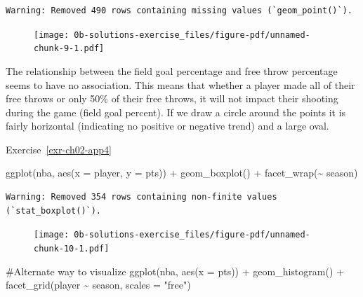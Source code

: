 \documentclass[
  letterpaper,
  DIV=11,
  numbers=noendperiod]{scrreprt}
\newenvironment{Shaded}{\begin{snugshade}}{\end{snugshade}}
\newcommand{\AttributeTok}[1]{\textcolor[rgb]{0.40,0.45,0.13}{#1}}
\newcommand{\CommentTok}[1]{\textcolor[rgb]{0.37,0.37,0.37}{#1}}
\newcommand{\FunctionTok}[1]{\textcolor[rgb]{0.28,0.35,0.67}{#1}}
\newcommand{\NormalTok}[1]{\textcolor[rgb]{0.00,0.23,0.31}{#1}}
\newcommand{\SpecialCharTok}[1]{\textcolor[rgb]{0.37,0.37,0.37}{#1}}
\newcommand{\StringTok}[1]{\textcolor[rgb]{0.13,0.47,0.30}{#1}}
\theoremstyle{definition}
\theoremstyle{remark}
\begin{document}
\begin{verbatim}
Warning: Removed 490 rows containing missing values (`geom_point()`).
\end{verbatim}

\begin{figure}[H]

{\centering \texttt{[image: 0b-solutions-exercise\_files/figure-pdf/unnamed-chunk-9-1.pdf]}

}

\end{figure}

The relationship between the field goal percentage and free throw
percentage seems to have no association. This means that whether a
player made all of their free throws or only 50\% of their free throws,
it will not impact their shooting during the game (field goal percent).
If we draw a circle around the points it is fairly horizontal
(indicating no positive or negative trend) and a large oval.

Exercise~\ref{exr-ch02-app4}

\begin{Shaded}
\begin{Highlighting}[]
\FunctionTok{ggplot}\NormalTok{(nba, }\FunctionTok{aes}\NormalTok{(}\AttributeTok{x =}\NormalTok{ player, }\AttributeTok{y =}\NormalTok{ pts)) }\SpecialCharTok{+}
  \FunctionTok{geom\_boxplot}\NormalTok{() }\SpecialCharTok{+}
  \FunctionTok{facet\_wrap}\NormalTok{(}\SpecialCharTok{\textasciitilde{}}\NormalTok{ season)}
\end{Highlighting}
\end{Shaded}

\begin{verbatim}
Warning: Removed 354 rows containing non-finite values (`stat_boxplot()`).
\end{verbatim}

\begin{figure}[H]

{\centering \texttt{[image: 0b-solutions-exercise\_files/figure-pdf/unnamed-chunk-10-1.pdf]}

}

\end{figure}

\begin{Shaded}
\begin{Highlighting}[]
\CommentTok{\#Alternate way to visualize}
\FunctionTok{ggplot}\NormalTok{(nba, }\FunctionTok{aes}\NormalTok{(}\AttributeTok{x =}\NormalTok{ pts)) }\SpecialCharTok{+}
  \FunctionTok{geom\_histogram}\NormalTok{() }\SpecialCharTok{+}
  \FunctionTok{facet\_grid}\NormalTok{(player }\SpecialCharTok{\textasciitilde{}}\NormalTok{ season, }\AttributeTok{scales =} \StringTok{"free"}\NormalTok{)}
\end{Highlighting}
\end{Shaded}
\end{document}
